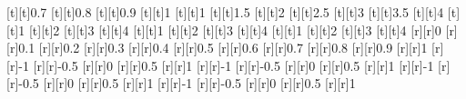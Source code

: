 \begin{psfrags}
[t][t]{0.7}%
[t][t]{0.8}%
[t][t]{0.9}%
[t][t]{1}%
[t][t]{1}%
[t][t]{1.5}%
[t][t]{2}%
[t][t]{2.5}%
[t][t]{3}%
[t][t]{3.5}%
[t][t]{4}%
[t][t]{1}%
[t][t]{2}%
[t][t]{3}%
[t][t]{4}%
[t][t]{1}%
[t][t]{2}%
[t][t]{3}%
[t][t]{4}%
[t][t]{1}%
[t][t]{2}%
[t][t]{3}%
[t][t]{4}%
%
[r][r]{0}%
[r][r]{0.1}%
[r][r]{0.2}%
[r][r]{0.3}%
[r][r]{0.4}%
[r][r]{0.5}%
[r][r]{0.6}%
[r][r]{0.7}%
[r][r]{0.8}%
[r][r]{0.9}%
[r][r]{1}%
[r][r]{-1}%
[r][r]{-0.5}%
[r][r]{0}%
[r][r]{0.5}%
[r][r]{1}%
[r][r]{-1}%
[r][r]{-0.5}%
[r][r]{0}%
[r][r]{0.5}%
[r][r]{1}%
[r][r]{-1}%
[r][r]{-0.5}%
[r][r]{0}%
[r][r]{0.5}%
[r][r]{1}%
[r][r]{-1}%
[r][r]{-0.5}%
[r][r]{0}%
[r][r]{0.5}%
[r][r]{1}%
%
%
\end{psfrags}%
%
